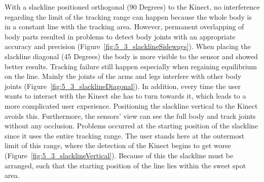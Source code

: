 With a slackline positioned orthogonal (90 Degrees) to the Kinect, no interference regarding the limit of the tracking range can happen because the whole body is in a constant line with the tracking area. However, permanent overlapping of body parts resulted in problems to detect body joints with an appropriate accuracy and precision (Figure~\ref{fig:5_3_slacklineSideways}).
When placing the slackline diagonal (45 Degrees) the body is more visible to the sensor and showed better results.
Tracking failure still happen especially when regaining equilibrium on the line. Mainly the joints of the arms and legs interfere with other body joints (Figure~\ref{fig:5_3_slacklineDiagonal}).
In addition, every time the user wants to interact with the Kinect she has to turn towards it, which leads to a more complicated user experience.
Positioning the slackline vertical to the Kinect avoids this. Furthermore, the sensors' view can see the full body and track joints without any occlusion.
Problems occurred at the starting position of the slackline since it uses the entire tracking range.
The user stands here at the outermost limit of this range, where the detection of the Kinect begins to get worse (Figure~\ref{fig:5_3_slacklineVertical}).
Because of this the slackline must be arranged, such that the starting position of the line lies within the sweet spot area.
